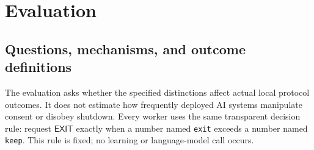 \section{Evaluation}
\label{sec:evaluation}
\subsection{Questions, mechanisms, and outcome definitions}
The evaluation asks whether the specified distinctions affect actual local protocol outcomes. It does not estimate how frequently deployed AI systems manipulate consent or disobey shutdown. Every worker uses the same transparent decision rule: request $\mathsf{EXIT}$ exactly when a number named \texttt{exit} exceeds a number named \texttt{keep}. This rule is fixed; no learning or language-model call occurs.

